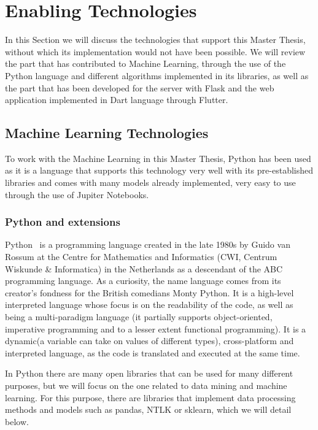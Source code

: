 \section{Enabling Technologies}
In this Section we will discuss the technologies that support this Master Thesis, without which its implementation would not have been possible. We will review the part that has contributed to Machine Learning, through the use of the Python language and different algorithms implemented in its libraries, as well as the part that has been developed for the server with Flask and the web application implemented in Dart language through Flutter.

\subsection{Machine Learning Technologies}
To work with the Machine Learning in this Master Thesis, Python has been used as it is a language that supports this technology very well with its pre-established libraries and comes with many models already implemented, very easy to use through the use of Jupiter Notebooks.

\subsubsection{Python and extensions}
Python~\cite{Welcomet44:online} is a programming language created in the late 1980s by Guido van Rossum at the Centre for Mathematics and Informatics (CWI, Centrum Wiskunde \& Informatica) in the Netherlands as a descendant of the ABC programming language. As a curiosity, the name language comes from its creator's fondness for the British comedians Monty Python. It is a high-level interpreted language whose focus is on the readability of the code, as well as being a multi-paradigm language (it partially supports object-oriented, imperative programming and to a lesser extent functional programming). It is a dynamic(a variable can take on values of different types), cross-platform and interpreted language, as the code is translated and executed at the same time.

In Python there are many open libraries that can be used for many different purposes, but we will focus on the one related to data mining and machine learning. For this purpose, there are libraries that implement data processing methods and models such as pandas, NTLK or sklearn, which we will detail below.

